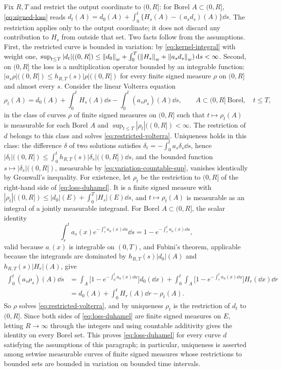Fix $R,T$ and restrict the output coordinate to $(0,R]$: for Borel
$A\subset(0,R]$, \eqref{eq:signed-loss} reads
$d_t(A)=d_0(A)+\int_0^t\{H_s(A)-(a_sd_s)(A)\}\dd s$. The restriction
applies only to the output coordinate; it does not discard any
contribution to $H_s$ from outside that set. Two facts follow from the
assumptions. First, the restricted curve is bounded in variation:
by \eqref{eq:kernel-integral} with weight one,
$\sup_{t\leq T}|d_t|((0,R])\leq\left\lVert d_0\right\rVert_w
+\int_0^T(\left\lVert H_s\right\rVert_w+\left\lVert a_sd_s\right\rVert_w)\,\mathrm d s<\infty$.
Second, on $(0,R]$ the loss is a multiplication operator bounded by an
integrable function: $|a_s\rho|((0,R])\leq h_{R,T}(s)|\rho|((0,R])$ for
every finite signed measure $\rho$ on $(0,R]$ and almost every $s$.
Consider the linear Volterra equation
\begin{equation}
 \rho_t(A)=d_0(A)+\int_0^tH_s(A)\dd s-\int_0^t(a_s\rho_s)(A)\dd s,
 \qquad A\subset(0,R]\ \text{Borel},\quad t\leq T,
 \label{eq:restricted-volterra}
\end{equation}
in the class of curves $\rho$ of finite signed measures on $(0,R]$ such
that $t\mapsto\rho_t(A)$ is measurable for each Borel $A$ and
$\sup_{t\leq T}|\rho_t|((0,R])<\infty$. The restriction of $d$ belongs to
this class and solves \eqref{eq:restricted-volterra}. Uniqueness holds in
this class: the difference $\delta$ of two solutions satisfies
$\delta_t=-\int_0^ta_s\delta_s\dd s$, hence
$|\delta_t|((0,R])\leq\int_0^th_{R,T}(s)|\delta_s|((0,R])\dd s$, and the
bounded function $s\mapsto|\delta_s|((0,R])$, measurable by
\eqref{eq:variation-countable-sup}, vanishes identically by Gronwall's
inequality. For existence, let $\rho_t$ be the restriction to $(0,R]$ of
the right-hand side of \eqref{eq:loss-duhamel}. It is a finite signed
measure with $|\rho_t|((0,R])\leq|d_0|(E)+\int_0^T|H_s|(E)\dd s$, and
$t\mapsto\rho_t(A)$ is measurable as an integral of a jointly measurable
integrand. For Borel $A\subset(0,R]$, the scalar identity
\[
 \int_r^ta_s(x)e^{-\int_r^sa_u(x)\dd u}\dd s=1-e^{-\int_r^ta_u(x)\dd u},
\]
valid because $a_\cdot(x)$ is integrable on $(0,T)$, and Fubini's theorem,
applicable because the integrands are dominated by $h_{R,T}(s)|d_0|(A)$
and $h_{R,T}(s)|H_r|(A)$, give
\begin{align*}
 \int_0^t(a_s\rho_s)(A)\dd s
 &=\int_A\bigl[1-e^{-\int_0^ta_u(x)\dd u}\bigr]d_0(\dd x)
  +\int_0^t\int_A\bigl[1-e^{-\int_r^ta_u(x)\dd u}\bigr]H_r(\dd x)\dd r\\
 &=d_0(A)+\int_0^tH_r(A)\dd r-\rho_t(A).
\end{align*}
So $\rho$ solves \eqref{eq:restricted-volterra}, and by uniqueness
$\rho_t$ is the restriction of $d_t$ to $(0,R]$. Since both sides of
\eqref{eq:loss-duhamel} are finite signed measures on $E$, letting
$R\to\infty$ through the integers and using countable additivity gives
the identity on every Borel set. This proves \eqref{eq:loss-duhamel}
for every curve $d$ satisfying the assumptions of this paragraph; in
particular, uniqueness is asserted among setwise measurable curves of
finite signed measures whose restrictions to bounded sets are bounded in
variation on bounded time intervals.

